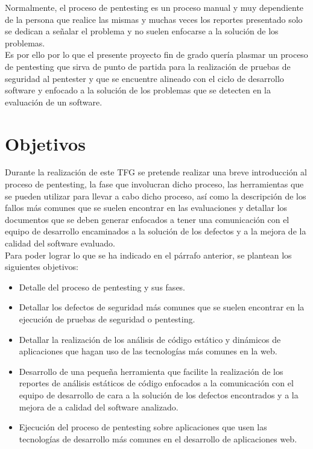 Normalmente, el proceso de pentesting es un proceso manual y muy dependiente de la persona que realice las mismas 
y muchas veces los reportes presentado solo se dedican a señalar el problema y no suelen enfocarse a la solución de los problemas.\\

Es por ello por lo que el presente proyecto fin de grado quería plasmar un proceso de pentesting que sirva de punto de partida
para la realización de pruebas de seguridad al pentester y que se encuentre alineado con el ciclo de desarrollo software
y enfocado a la solución de los problemas que se detecten en la evaluación de un software.\\

\section{Objetivos}
Durante la realización de este TFG se pretende realizar una breve introducción al proceso de pentesting, la fase que involucran 
dicho proceso, las herramientas que se pueden utilizar para llevar a cabo dicho proceso, así como la descripción de los fallos más
comunes que se suelen encontrar en las evaluaciones y detallar los documentos que se deben generar enfocados a tener
una comunicación con el equipo de desarrollo encaminados a la solución de los defectos 
y a la mejora de la calidad del software evaluado.\\

Para poder lograr lo que se ha indicado en el párrafo anterior, se plantean los siguientes objetivos:

\begin{itemize}
    \item Detalle del proceso de pentesting y sus fases.
    \item Detallar los defectos de seguridad más comunes que se suelen encontrar en la ejecución de pruebas de seguridad o pentesting.
    \item Detallar la realización de los análisis de código estático y dinámicos de aplicaciones que hagan uso de las tecnologías más comunes en la web.
    \item Desarrollo de una pequeña herramienta que facilite la realización de los reportes de análisis 
    estáticos de código enfocados a la comunicación con el equipo de desarrollo de cara a la solución de los defectos 
    encontrados y a la mejora de a calidad del software analizado. 
    \item Ejecución del proceso de pentesting sobre aplicaciones que usen las tecnologías de desarrollo más comunes 
    en el desarrollo de aplicaciones web.
\end{itemize}

